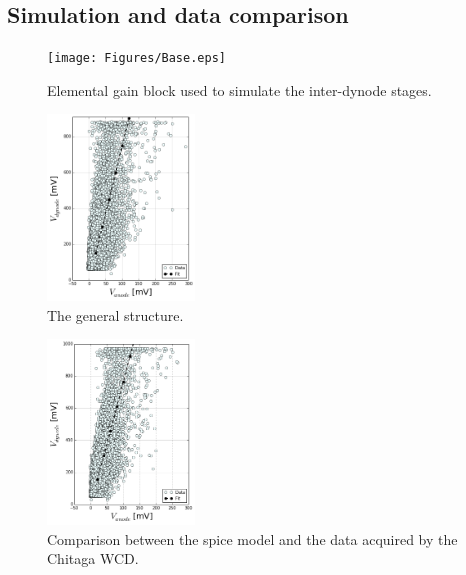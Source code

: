 \documentclass[letterpaper, 10 pt, conference]{ieeeconf}  %
\begin{document}
\subsection{Simulation and data comparison}

\begin{figure}[h!]
\begin{center}
\texttt{[image: Figures/Base.eps]}
\caption{Elemental gain block used to simulate the inter-dynode stages.}
\label{Chain}
\end{center}
\end{figure}

\begin{figure}[h!]
\begin{center}
\includegraphics[width=0.35\textwidth]{Figures/Fit_1100}
\caption{The general structure.}
\label{QE}
\end{center}
\end{figure}

\begin{figure}[h!]
\begin{center}
\includegraphics[width=0.35\textwidth]{Figures/Fit_1200}
\caption{Comparison between the spice model and the data acquired by the Chitaga WCD.}
\label{QE}
\end{center}
\end{figure}
\end{document}

